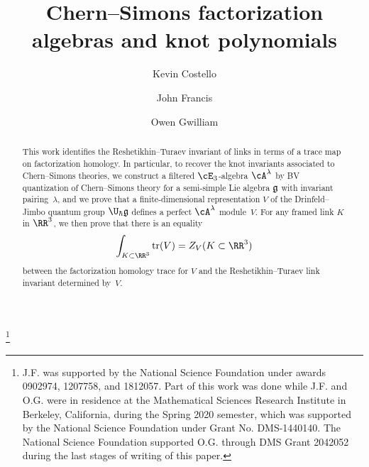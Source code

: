 \documentclass[10pt]{amsart}
\begin{document}
\title{Chern--Simons factorization algebras and knot polynomials}

\author{
  Kevin Costello
  \and
  John Francis
  \and
  Owen Gwilliam
}



\thanks{J.F. was supported by the National Science Foundation under awards 0902974, 1207758, and 1812057. Part of this work was done while J.F. and O.G. were in residence at the Mathematical Sciences Research Institute in Berkeley, California, during the Spring 2020 semester, which was supported by the National Science Foundation under Grant No. DMS-1440140. The National Science Foundation supported O.G. through DMS Grant 2042052 during the last stages of writing of this paper.}






\begin{abstract}
This work identifies the Reshetikhin--Turaev invariant of links in terms of a trace map on factorization homology. 
In particular, to recover the knot invariants associated to Chern--Simons theories,
we construct a filtered $\cE_3$-algebra $\cA^\lambda$ by BV quantization of Chern--Simons theory for a semi-simple Lie algebra ${\frak g}$ with invariant pairing~$\lambda$, 
and we prove that a finite-dimensional representation $V$ of the Drinfeld--Jimbo quantum group $\U_\hbar{\frak g}$ defines a perfect $\cA^\lambda$ module~$V$. 
For any framed link $K$ in $\RR^3$, we then prove that there is an equality
\[
\int_{K\subset\RR^3}{\rm tr}(V) = Z_V(K\subset\RR^3)
\]
between the factorization homology trace for $V$ and the Reshetikhin--Turaev link invariant determined by~$V$.
\end{abstract}






	

\maketitle
\end{document}
